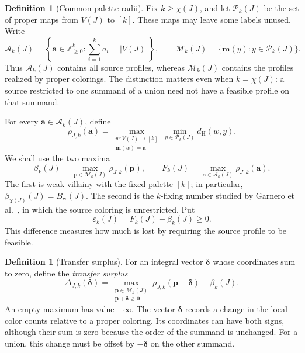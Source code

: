 \documentclass[10pt,a4paper]{amsart}
\numberwithin{equation}{section}
\theoremstyle{definition}
\newtheorem{definition}[theorem]{Definition}
\theoremstyle{remark}
\begin{document}
\begin{definition}[Common-palette radii]\label{def:common-palette}
Fix $k\ge\chi(J)$, and let $\mathcal P_k(J)$ be
the set of proper maps from $V(J)$ to $[k]$.  These maps may leave some
labels unused.  Write
\[
 \mathcal A_k(J)=
 \left\{\mathbf a\in\mathbb Z_{\ge0}^k:
          \sum_{i=1}^k a_i=|V(J)|\right\},
 \qquad
 \mathcal M_k(J)=\{\mathbf m(y):y\in\mathcal P_k(J)\}.
\]
Thus $\mathcal A_k(J)$ contains all source profiles, whereas
$\mathcal M_k(J)$ contains the profiles realized by proper colorings.
The distinction matters even when $k=\chi(J)$: a source restricted to
one summand of a union need not have a feasible profile on that summand.

For every $\mathbf a\in\mathcal A_k(J)$, define
\[
 \rho_{J,k}(\mathbf a)=
 \max_{\substack{w:V(J)\to[k]\\\mathbf m(w)=\mathbf a}}
 \min_{y\in\mathcal P_k(J)}d_{\mathrm H}(w,y).
\]
We shall use the two maxima
\begin{equation}\label{union:palette-radii}
 \beta_k(J)=\max_{\mathbf p\in\mathcal M_k(J)}
                      \rho_{J,k}(\mathbf p),
 \qquad
 F_k(J)=\max_{\mathbf a\in\mathcal A_k(J)}
                      \rho_{J,k}(\mathbf a).
\end{equation}
The first is weak villainy with the fixed palette $[k]$; in particular,
$\beta_{\chi(J)}(J)=B_{\mathrm w}(J)$.
The second is the $k$-fixing number studied by
Garnero et al.~\cite{garnero2018}, in which the source coloring is
unrestricted.  Put
\[
 \varepsilon_k(J)=F_k(J)-\beta_k(J)\ge0.
\]
This difference measures how much is lost by requiring the source
profile to be feasible.
\end{definition}

\begin{definition}[Transfer surplus]\label{def:transfer-surplus}
For an integral vector $\boldsymbol\delta$ whose coordinates sum to
zero, define the \emph{transfer surplus}
\begin{equation}\label{union:surplus-definition}
 \Delta_{J,k}(\boldsymbol\delta)=
 \max_{\substack{\mathbf p\in\mathcal M_k(J)\\
                 \mathbf p+\boldsymbol\delta\ge\mathbf0}}
       \rho_{J,k}(\mathbf p+\boldsymbol\delta)-\beta_k(J).
\end{equation}
An empty maximum has value $-\infty$.  The vector
$\boldsymbol\delta$ records a change in the local color counts relative
to a proper coloring.  Its coordinates can have both signs, although
their sum is zero because the order of the summand is unchanged.
For a union, this change must be offset by
$-\boldsymbol\delta$ on the other summand.
\end{definition}
\end{document}
